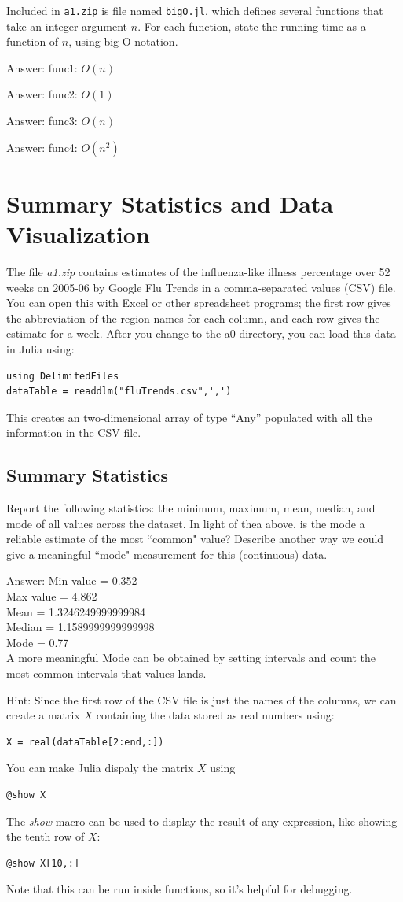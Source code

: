 \documentclass{article}
\def\ans#1{\par\gre{Answer: #1}}
\def\blu#1{{\color{blu}#1}}
\def\gre#1{{\color{gre}#1}}
\begin{document}
Included in \texttt{a1.zip} is file named \texttt{bigO.jl}, which defines several functions
that take an integer argument $n$. For each function, \blu{state the running time as a function of $n$, using big-O notation}.
\ans{func1: $O(n)$}
\ans{func2: $O(1)$}
\ans{func3: $O(n)$}
\ans{func4: $O(n^2)$}


\section{Summary Statistics and Data Visualization}

The file \emph{a1.zip} contains estimates of the influenza-like illness percentage over 52 weeks on 2005-06 by Google Flu Trends in a comma-separated values (CSV) file. You can open this with Excel or other spreadsheet programs; the first row gives the abbreviation of the region names for each column, and each row gives the estimate for a week.
After you change to the a0 directory, you can load this data in Julia using:
\begin{verbatim}
using DelimitedFiles
dataTable = readdlm("fluTrends.csv",',')
\end{verbatim}
This creates an two-dimensional array of type ``Any''  populated with all the information in the CSV file.

\subsection{Summary Statistics}

\blu{Report the following statistics}: the minimum, maximum, mean, median, and mode of all values across the dataset. In light of thea above, \blu{is the mode a reliable estimate of the most ``common" value? Describe another way we could give a meaningful ``mode" measurement for this (continuous) data.}
\ans{Min value = 0.352\\Max value = 4.862\\ Mean = 1.3246249999999984\\
Median = 1.1589999999999998 \\ Mode = 0.77\\
A more meaningful Mode can be obtained by setting intervals and count the most common intervals that values lands.
}

Hint: Since the first row of the CSV file is just the names of the columns, we can create a matrix $X$ containing the data stored as real numbers using:
\begin{verbatim}
X = real(dataTable[2:end,:])
\end{verbatim}
You can make Julia dispaly the matrix $X$ using
\begin{verbatim}
@show X
\end{verbatim}
The \emph{show} macro can be used to display the result of any expression, like showing the tenth row of $X$:
\begin{verbatim}
@show X[10,:]
\end{verbatim}
Note that this can be run inside functions, so it's helpful for debugging.
\end{document}
